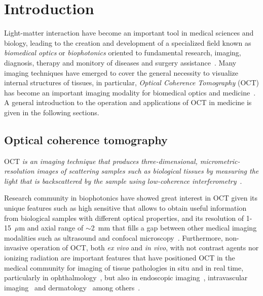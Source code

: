 \newpage
{}
\chapter{Introduction}\label{chap:intro}

Light-matter interaction have become an important tool in medical sciences and biology, leading to the creation and development of a specialized field known as \textit{biomedical optics} or \textit{biophotonics} oriented to fundamental research, imaging, diagnosis, therapy and monitory of diseases and surgery assistance~\cite{Keiser2016_Biophotonics}. Many imaging techniques have emerged to cover the general necessity to visualize internal structures of tissues, in particular, \textit{Optical Coherence Tomography} (OCT) has become an important imaging modality for biomedical optics and medicine~\cite{Keiser2016_Biophotonics, Fujimoto2015_Optical}. A general introduction to the operation and applications of OCT in medicine is given in the following sections.

\section{Optical coherence tomography}

OCT \textit{is an imaging technique that produces three-dimensional, micrometric-resolution images of scattering samples such as biological tissues by measuring the light that is backscattered by the sample using low-coherence interferometry}~\cite{Huang1991_Optical, Fujimoto2015_Optical}.

Research community in biophotonics have showed great interest in OCT given its unique features such as high sensitive that allows to obtain useful information from biological samples with different optical properties, and its resolution of 1-15~$\mu$m and axial range of $\sim$2~mm that fills a gap between other medical imaging modalities such as ultrasound and confocal microscopy~\cite{Fujimoto2015_Introduction}. Furthermore, non-invasive operation of OCT, both \textit{ex vivo} and \textit{in vivo}, with not contrast agents nor ionizing radiation are important features that have positioned OCT in the medical community for imaging of tissue pathologies in situ and in real time, particularly in ophthalmology~\cite{Swanson1993_vivo, Schuman2004_Optical}, but also in endoscopic imaging~\cite{Tearney1997_vivo}, intravascular imaging~\cite{Tearney1996_CatheterBased, Bouma2017_Intravascular} and dermatology~\cite{Welzel1997_Optical, Olsen2018_Advances} among others~\cite{Colston1998_Imaging, Suter2012_Optical, Vakoc2012_Cancer}.

